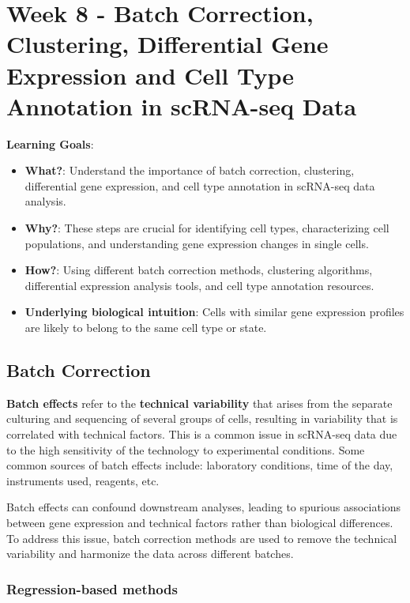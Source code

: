 \documentclass[a4paper]{article}
\begin{document}
\newpage

\section*{Week 8 - Batch Correction, Clustering, Differential Gene Expression
and Cell Type Annotation in scRNA-seq Data}

\textbf{Learning Goals}:

\begin{itemize}
  \item \textbf{What?}: Understand the importance of batch correction, clustering, differential gene expression, and cell type annotation in scRNA-seq data analysis.
  \item \textbf{Why?}: These steps are crucial for identifying cell types, characterizing cell populations, and understanding gene expression changes in single cells.
  \item \textbf{How?}: Using different batch correction methods, clustering algorithms, differential expression analysis tools, and cell type annotation resources.
  \item \textbf{Underlying biological intuition}: Cells with similar gene expression profiles are likely to belong to the same cell type or state.
\end{itemize}

\subsection*{Batch Correction}

\textbf{Batch effects} refer to the \textbf{technical variability} that
arises from the separate culturing and sequencing of several groups of
cells, resulting in variability that is correlated with technical factors.
This is a common issue in scRNA-seq data due to the high sensitivity of
the technology to experimental conditions. Some common sources of batch
effects include: laboratory conditions, time of the day, instruments used,
reagents, etc.

Batch effects can confound downstream analyses, leading to spurious
associations between gene expression and technical factors rather than
biological differences. To address this issue, batch correction methods
are used to remove the technical variability and harmonize the data
across different batches.

\subsubsection*{Regression-based methods} 
\end{document}
